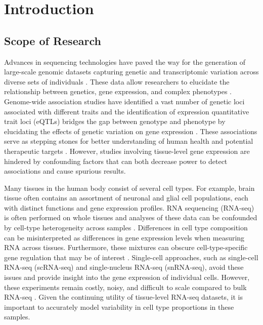 \chapter{Introduction}
\section{Scope of Research}
Advances in sequencing technologies have paved the way for the generation of large-scale genomic datasets capturing genetic and transcriptomic variation across diverse sets of individuals \cite{Bycroft2018, GTEx_Consortium2020-xx}. These data allow researchers to elucidate the relationship between genetics, gene expression, and complex phenotypes \cite{Gusev2016}. Genome-wide association studies have identified a vast number of genetic loci associated with different traits \cite{gwas} and the identification of expression quantitative trait loci (eQTLs) bridges the gap between genotype and phenotype by elucidating the effects of genetic variation on gene expression \cite{Nica2013}. These associations serve as stepping stones for better understanding of human health and potential therapeutic targets \cite{Motsinger-Reif2013, walker2001pharmaceutical}. However, studies involving tissue-level gene expression are hindered by confounding factors that can both decrease power to detect associations and cause spurious results.

Many tissues in the human body consist of several cell types. For example, brain tissue often contains an assortment of neuronal and glial cell populations, each with distinct functions and gene expression profiles. RNA sequencing (RNA-seq) is often performed on whole tissues and analyses of these data can be confounded by cell-type heterogeneity across samples \cite{farahbod2020untangling}. Differences in cell type composition can be misinterpreted as differences in gene expression levels when measuring RNA across tissues. Furthermore, these mixtures can obscure cell-type-specific gene regulation that may be of interest \cite{Westra2015-vq, Shen-Orr2010-tg}. Single-cell approaches, such as single-cell RNA-seq (scRNA-seq) and single-nucleus RNA-seq (snRNA-seq), avoid these issues and provide insight into the gene expression of individual cells. However, these experiments remain costly, noisy, and difficult to scale compared to bulk RNA-seq \cite{lahnemann2020eleven}. Given the continuing utility of tissue-level RNA-seq datasets, it is important to accurately model variability in cell type proportions in these samples.

